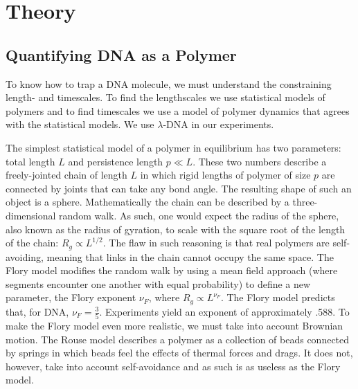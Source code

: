 \documentclass[aps,prl,preprint,groupedaddress]{revtex4}
\begin{document}
\section{Theory}

\subsection{Quantifying DNA as a Polymer}

To know how to trap a DNA molecule, we must understand the constraining length- and timescales. To find the lengthscales we use statistical models of polymers and to find timescales we use a model of polymer dynamics that agrees with the statistical models. We use \(\lambda\)-DNA in our experiments.

The simplest statistical model of a polymer in equilibrium has two parameters: total length \(L\) and persistence length \(p \ll L\). These two numbers describe a freely-jointed chain of length \(L\) in which rigid lengths of polymer of size \(p\) are connected by joints that can take any bond angle. The resulting shape of such an object is a sphere. Mathematically the chain can be described by a three-dimensional random walk. As such, one would expect the radius of the sphere, also known as the radius of gyration, to scale with the square root of the length of the chain: \(R_g \propto L^{1/2}\). The flaw in such reasoning is that real polymers are self-avoiding, meaning that links in the chain cannot occupy the same space. The Flory model modifies the random walk by using a mean field approach (where segments encounter one another with equal probability) to define a new parameter, the Flory exponent \(\nu_F\), where \(R_g \propto L^{\nu_F}\). The Flory model predicts that, for DNA, \(\nu_F = \frac{3}{5}\). Experiments yield an exponent of approximately .588. To make the Flory model even more realistic, we must take into account Brownian motion. The Rouse model describes a polymer as a collection of beads connected by springs in which beads feel the effects of thermal forces and drags. It does not, however, take into account self-avoidance and as such is as useless as the Flory model. 
\end{document}
